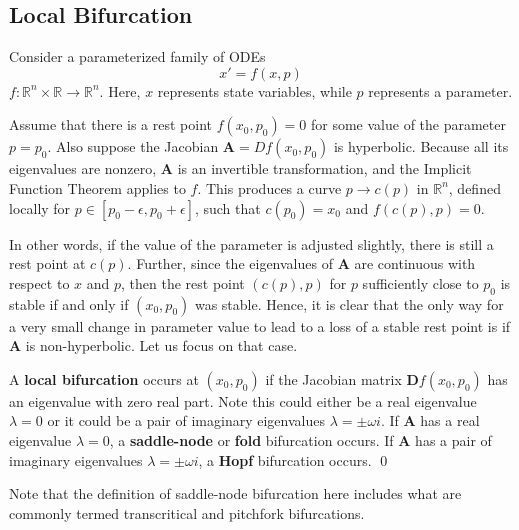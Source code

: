 \subsection{Local Bifurcation}

Consider a parameterized family of ODEs
%
\begin{equation}
	x' = f(x, p)
\end{equation}
%
$f: \mathbb{R}^n \times \mathbb{R} \to \mathbb{R}^n$. Here, $x$ represents state variables, while $p$ represents a parameter. 

Assume that there is a rest point $f(x_0,p_0) = 0$ for some value of the parameter $p = p_0$. Also suppose the Jacobian $\mathbf{A} = Df(x_0, p_0)$ is hyperbolic.
%
%
Because all its eigenvalues are nonzero, $\mathbf{A}$ is an invertible transformation, and the Implicit Function Theorem applies to $f$. This produces a curve $p \to c(p)$ in $\mathbb{R}^n$, defined locally for $p \in [p_0-\epsilon, p_0 + \epsilon]$, such that $c(p_0) = x_0$ and $f(c(p), p) = 0$. 

In other words, if the value of the parameter is adjusted slightly, there is still a rest point at $c(p)$. Further, since the eigenvalues of $\textbf{A}$ are continuous with respect to $x$ and $p$, then the rest point $(c(p), p)$ for $p$ sufficiently close to $p_0$ is stable if and only if $(x_0,p_0)$ was stable. Hence, it is clear that the only way for a very small change in parameter value to lead to a loss of a stable rest point is if $\mathbf{A}$ is non-hyperbolic. Let us focus on that case.

\begin{definition}
	A \textbf{local bifurcation} occurs at ${\displaystyle (x_{0}, p_{0})}$ if the Jacobian matrix ${\displaystyle {\mathbf{D}f(x_{0},p _{0})}}$ has an eigenvalue with zero real part. Note this could either be a real eigenvalue $\lambda = 0$ or it could be a pair of imaginary eigenvalues $\lambda = \pm \omega i$. If $\textbf{A}$ has a real eigenvalue $\lambda = 0$, a \textbf{saddle-node} or \textbf{fold} bifurcation occurs. If $\textbf{A}$ has a pair of imaginary eigenvalues $\lambda = \pm \omega i$, a \textbf{Hopf} bifurcation occurs. \qed
\end{definition}

Note that the definition of saddle-node bifurcation here includes what are commonly termed transcritical and pitchfork bifurcations. 


